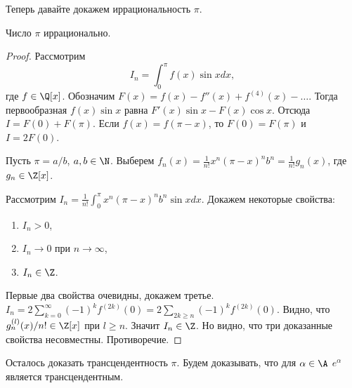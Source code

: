 Теперь давайте докажем иррациональность $\pi$.

\begin{theorem}
  Число $\pi$ иррационально.
\end{theorem}
\begin{proof}
  Рассмотрим
  $$
    I_n = \int_0^{\pi} f(x) \sin x dx,
  $$
  где $f \in \Q[x]$.
  Обозначим $F(x) = f(x) - f''(x) + f^{(4)}(x) - \ldots$. Тогда первообразная $f(x) \sin x$ равна $F'(x) \sin x - F(x) \cos x$. Отсюда $I = F(0) + F(\pi)$. Если $f(x) = f(\pi - x)$, то $F(0) = F(\pi)$ и $I = 2F(0)$.
  
  Пусть $\pi = a / b$, $a, b \in \N$. Выберем $f_n(x) = \frac{1}{n!} x^n (\pi - x)^n b^n = \frac{1}{n!} g_n(x)$, где $g_n \in \Z[x]$.
  
  Рассмотрим $I_n = \frac{1}{n!} \int_0^{\pi} x^n (\pi - x)^n b^n \sin x dx$. Докажем некоторые свойства:
  \begin{enumerate}
    \item $I_n > 0$,
    \item $I_n \to 0$ при $n \to \infty$,
    \item $I_n \in \Z$.
  \end{enumerate}
  Первые два свойства очевидны, докажем третье.
  $I_n = 2 \sum_{k=0}^{\infty} (-1)^k f^{(2k)}(0) = 2 \sum_{2k \geqslant n} (-1)^k f^{(2k)}(0)$. Видно, что $g_n^{(l)}(x) / n! \in \Z[x]$ при $l \geqslant n$.
  Значит $I_n \in \Z$. Но видно, что три доказанные свойства несовместны. Противоречие.
\end{proof}

Осталось доказать трансцендентность $\pi$. Будем доказывать, что для $\alpha \in \A$ $e^{\alpha}$ является трансцендентным.
